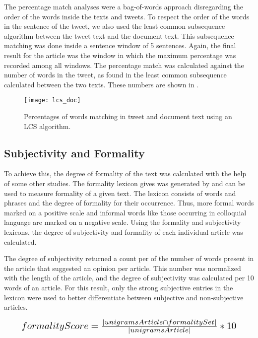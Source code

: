 The percentage match analyses were a bag-of-words approach disregarding the order of the words inside the texts and tweets. To respect the order of the words in the sentence of the tweet, we also used the least common subsequence algorithm between the tweet text and the document text. This subsequence matching was done inside a sentence window of 5 sentences. Again, the final result for the article was the window in which the maximum percentage was recorded among all windows. The percentage match was calculated against the number of words in the tweet, as found in the least common subsequence calculated between the two texts. These numbers are shown in .

\begin{figure}[htbp]
\centering
\texttt{[image: lcs\_doc]}
\caption{Percentages of words matching in tweet and document text using an LCS algorithm.}
\label{fig:lcs}
\end{figure}



\subsection{Subjectivity and Formality}

To achieve this, the degree of formality of the text was calculated with the help of some other studies. The formality lexicon gives was generated by  and can be used to measure formality of a given text. The lexicon consists of words and phrases and the degree of formality for their occurrence. Thus, more formal words marked on a positive scale and informal words like those occurring in colloquial language are marked on a negative scale. Using the formality and subjectivity lexicons, the degree of subjectivity and formality of each individual article was calculated. 

The degree of subjectivity returned a count per of the number of words present in the article that suggested an opinion per article. This number was normalized with the length of the article, and the degree of subjectivity was calculated per 10 words of an article. For this result, only the strong subjective entries in the lexicon were used to better differentiate between subjective and non-subjective articles.

\begin{equation}
\resizebox{.9\hsize}{!}{$formalityScore = \frac{| unigramsArticle \cap formalitySet |}{| unigramsArticle |} * 10$}
\end{equation}

